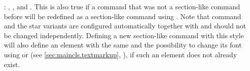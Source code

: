 \begin{labeling}{:}
  , , and . This is also
  true if a command that was not a section-like command before will be
  redefined as a section-like command using
  . Note that command
   and the star variants are configured automatically together
  with  and should not be changed independently. Defining a new
  section-like command with this style will also define an element with the
  same  and the possibility to change its font using
   or  (see
  \autoref{sec:maincls.textmarkup},
  ), if such an element does not
  already exist.
\end{labeling}

